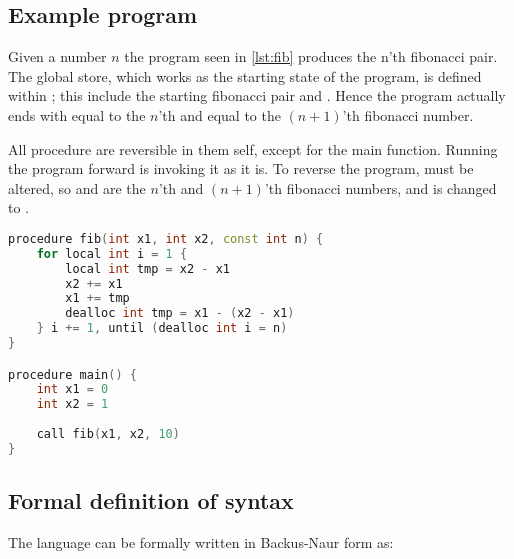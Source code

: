 \subsection*{Example program}
Given a number $n$ the program seen in \autoref{lst:fib} produces the n'th fibonacci
pair. The global store, which works as the starting state of the program, is defined within
; this include the starting fibonacci pair
 and . Hence the program actually ends with  equal to the $n$'th
and  equal to the $(n+1)$'th fibonacci number.

All \lan procedure are reversible in them self, except for the main function. Running the program
forward is invoking it as it is. To reverse the program,  must be altered, so
 and  are the $n$'th and $(n+1)$'th fibonacci numbers, and
 is changed to .

\begin{lstlisting}[language=C++, label={lst:fib}, caption={Program finding the \lsin{n}'th fibonacci number.}]
procedure fib(int x1, int x2, const int n) {
    for local int i = 1 {
        local int tmp = x2 - x1
        x2 += x1
        x1 += tmp
        dealloc int tmp = x1 - (x2 - x1)
    } i += 1, until (dealloc int i = n)
}

procedure main() {
    int x1 = 0
    int x2 = 1
    
    call fib(x1, x2, 10)
}
\end{lstlisting}


\subsection{Formal definition of syntax}
The language \lan can be formally written in Backus-Naur form as:

